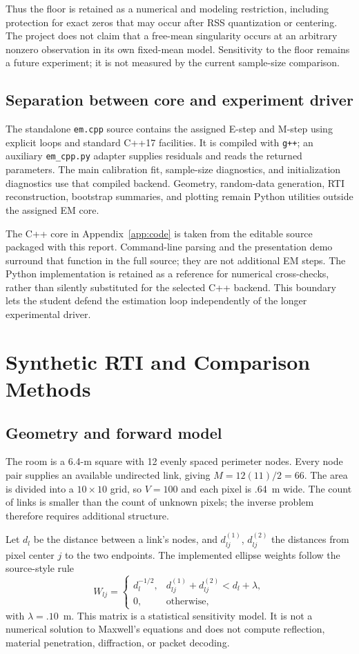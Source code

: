 \documentclass[conference,letterpaper]{IEEEtran}
\begin{document}
Thus the floor is retained as a numerical and modeling restriction, including protection for exact zeros that may occur after RSS quantization or centering. The project does not claim that a free-mean singularity occurs at an arbitrary nonzero observation in its own fixed-mean model. Sensitivity to the floor remains a future experiment; it is not measured by the current sample-size comparison.

\subsection{Separation between core and experiment driver}
The standalone \texttt{em.cpp} source contains the assigned E-step and M-step using explicit loops and standard C++17 facilities. It is compiled with \texttt{g++}; an auxiliary \texttt{em\_cpp.py} adapter supplies residuals and reads the returned parameters. The main calibration fit, sample-size diagnostics, and initialization diagnostics use that compiled backend. Geometry, random-data generation, RTI reconstruction, bootstrap summaries, and plotting remain Python utilities outside the assigned EM core.

The C++ core in Appendix~\ref{app:code} is taken from the editable source packaged with this report. Command-line parsing and the presentation demo surround that function in the full source; they are not additional EM steps. The Python implementation is retained as a reference for numerical cross-checks, rather than silently substituted for the selected C++ backend. This boundary lets the student defend the estimation loop independently of the longer experimental driver.

\section{Synthetic RTI and Comparison Methods}
\subsection{Geometry and forward model}
The room is a 6.4-m square with 12 evenly spaced perimeter nodes. Every node pair supplies an available undirected link, giving $M=12(11)/2=66$. The area is divided into a $10\times10$ grid, so $V=100$ and each pixel is .64~m wide. The count of links is smaller than the count of unknown pixels; the inverse problem therefore requires additional structure.

Let $d_l$ be the distance between a link's nodes, and $d_{lj}^{(1)}$, $d_{lj}^{(2)}$ the distances from pixel center $j$ to the two endpoints. The implemented ellipse weights follow the source-style rule
\begin{equation}
W_{lj}=\begin{cases}d_l^{-1/2},&d_{lj}^{(1)}+d_{lj}^{(2)}<d_l+\lambda,\\0,&\text{otherwise},\end{cases}
\end{equation}
with $\lambda=.10$~m. This matrix is a statistical sensitivity model. It is not a numerical solution to Maxwell's equations and does not compute reflection, material penetration, diffraction, or packet decoding.
\end{document}
